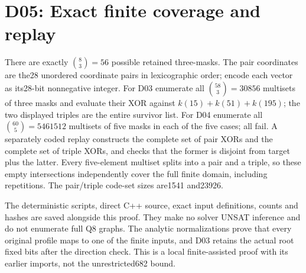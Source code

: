 \documentclass{article}
\begin{document}
\section{D05: Exact finite coverage and replay}
There are exactly $\binom83=56$ possible retained three-masks. The pair
coordinates are the28 unordered coordinate pairs in lexicographic order;
encode each vector as its28-bit nonnegative integer. For D03 enumerate
all $\binom{58}3=30856$ multisets of three masks and evaluate their XOR
against $k(15)+k(51)+k(195)$; the two displayed triples are the entire
survivor list.
For D04 enumerate all $\binom{60}5=5461512$ multisets of five masks in
each of the five cases; all fail. A separately coded replay constructs
the complete set of pair XORs and the complete set of triple XORs, and
checks that the former is disjoint from target plus the latter. Every
five-element multiset splits into a pair and a triple, so these empty
intersections independently cover the full finite domain, including
repetitions. The pair/triple code-set sizes are1541 and23926.

The deterministic scripts, direct C++ source, exact input definitions,
counts and hashes are saved alongside this proof. They make no solver
UNSAT inference and do not enumerate full Q8 graphs. The analytic
normalizations prove that every original profile maps to one of the
finite inputs, and D03 retains the actual root fixed bits after the
direction check. This is a local finite-assisted proof with its earlier
imports, not the unrestricted682 bound.
\end{document}
